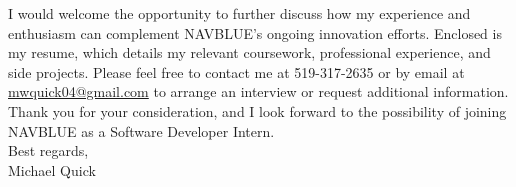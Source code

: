 \documentclass[11pt]{article}
\begin{document}
I would welcome the opportunity to further discuss how my experience and enthusiasm can complement NAVBLUE’s ongoing innovation efforts. Enclosed is my resume, which details my relevant coursework, professional experience, and side projects. Please feel free to contact me at 519-317-2635 or by email at \href{mailto:mwquick04@gmail.com}{mwquick04@gmail.com} to arrange an interview or request additional information.\\

Thank you for your consideration, and I look forward to the possibility of joining NAVBLUE as a Software Developer Intern.\\

\noindent Best regards,\\

\noindent Michael Quick
\end{document}
